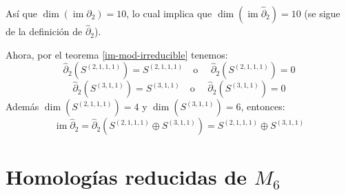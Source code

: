 \documentclass[12pt]{book}
\theoremstyle{definition}
\DeclareMathOperator{\im}{im}
\newcounter{in}
\newcounter{ini}
\begin{document}
Así que $\dim(\im\partial_{2})=10$, lo cual implica que
$\dim(\im\widehat\partial_{2})=10$ (se sigue de la definición de
$\widehat\partial_{2}$).

Ahora, por el teorema \ref{im-mod-irreducible} tenemos:
$$\widehat\partial_{2}(S^{(2,1,1,1)})=S^{(2,1,1,1)} \quad \mbox{o }\quad \widehat\partial_{2}(S^{(2,1,1,1)})=0$$
$$\widehat\partial_{2}(S^{(3,1,1)})=S^{(3,1,1)} \quad \mbox{o }\quad \widehat\partial_{2}(S^{(3,1,1)})=0$$
Además $\dim(S^{(2,1,1,1)})=4$ y $\dim(S^{(3,1,1)})=6$, entonces:
$$\im\widehat\partial_{2}=\widehat\partial_{2}(S^{(2,1,1,1)}\oplus S^{(3,1,1)})=S^{(2,1,1,1)}\oplus S^{(3,1,1)}$$

\section{Homologías reducidas de $M_{6}$}
\label{hom-red-M6}
\end{document}
